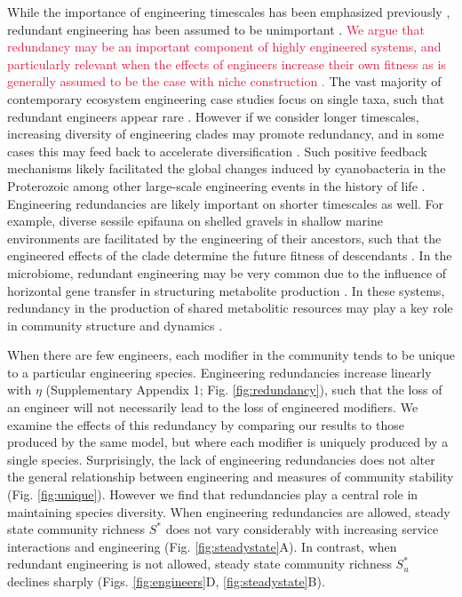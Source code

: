 \documentclass[twocolumn,preprintnumbers,amsmath,amssymb,superscriptaddress,linenumbers]{revtex4-1}
\newcommand{\rev}[1]{\textcolor{crimson}{#1}}
\begin{document}
While the importance of engineering timescales has been emphasized previously \cite{Hastings2007}, redundant engineering has been assumed to be unimportant \cite{Lawton1994}.
\rev{We argue that redundancy may be an important component of highly engineered systems, and particularly relevant when the effects of engineers increase their own fitness \cite{Cuddington2004} as is generally assumed to be the case with niche construction \cite{Krakauer2009}.}
The vast majority of contemporary ecosystem engineering case studies focus on single taxa, such that redundant engineers appear rare \cite{Lawton1994}.
However if we consider longer timescales, increasing diversity of engineering clades may promote redundancy, and in some cases this may feed back to accelerate diversification \cite{OdlingSmee2013b}.
Such positive feedback mechanisms likely facilitated the global changes induced by cyanobacteria in the Proterozoic \cite{Erwin2008,Schirrmeister2013} among other large-scale engineering events in the history of life \cite{Erwin2008}.
Engineering redundancies are likely important on shorter timescales as well.
For example, diverse sessile epifauna on shelled gravels in shallow marine environments are facilitated by the engineering of their ancestors, such that the engineered effects of the clade determine the future fitness of descendants \cite{Kidwell1986}.
In the microbiome, redundant engineering may be very common due to the influence of horizontal gene transfer in structuring metabolite production \cite{Polz2013}.
In these systems, redundancy in the production of shared metabolitic resources may play a key role in community structure and dynamics \cite{Kallus2017,Muscarella2017}.




When there are few engineers, each modifier in the community tends to be unique to a particular engineering species.
Engineering redundancies increase linearly with $\eta$ (Supplementary Appendix 1; Fig. \ref{fig:redundancy}), such that the loss of an engineer will not necessarily lead to the loss of engineered modifiers. %
We examine the effects of this redundancy by comparing our results to those produced by the same model, but where each modifier is uniquely produced by a single species.
Surprisingly, the lack of engineering redundancies does not alter the general relationship between engineering and measures of community stability (Fig. \ref{fig:unique}).
However we find that redundancies play a central role in maintaining species diversity.
When engineering redundancies are allowed, steady state community richness $S^*$ does not vary considerably with increasing service interactions and engineering (Fig. \ref{fig:steadystate}A).
In contrast, when redundant engineering is not allowed, steady state community richness $S^*_u$ declines sharply (Figs. \ref{fig:engineers}D, \ref{fig:steadystate}B).
\end{document}
